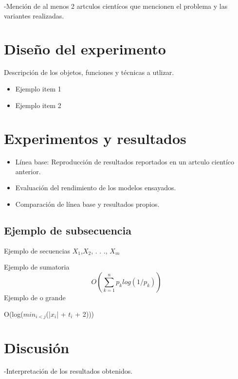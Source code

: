 \documentclass[twocolumn]{article}
\begin{document}
-Mención de al menos 2 artculos cientícos que mencionen el problema y las variantes
realizadas.

\section{Diseño del experimento}
Descripción de los objetos, funciones y técnicas a utlizar.

\begin{itemize}
	\item
	Ejemplo item 1
	\item
	Ejemplo item 2
	\end{itemize}	

\section{Experimentos y resultados}

\begin{itemize}
	\item
	Línea base: Reproducción de resultados reportados en un artculo cientíco
anterior.
	\item
	Evaluación del rendimiento de los modelos ensayados.
    \item
    Comparación de línea base y resultados propios.
	\end{itemize}	

\subsection{Ejemplo de subsecuencia}

Ejemplo de secuencias $X_{1}$,$X_{2}$, . . ., $X_{m}$

Ejemplo de sumatoria
\[O(
\sum_{k=1}^{n}p_{k}log(1/p_{k}))
\]
 Ejemplo de o grande
\begin{center}
 O(log($min_{i<j}$(|$x_{i}$| + $t_{i}$ + 2)))    
\end{center}

\section{Discusión}

-Interpretación de los resultados obtenidos.
\end{document}
